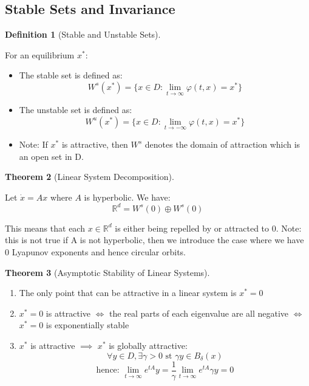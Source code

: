 \documentclass{article}
\newtheorem{thm}{Theorem}[section]
\newtheorem{defn}[thm]{Definition}
\begin{document}
\subsection{Stable Sets and Invariance}
\begin{defn}[Stable and Unstable Sets]\end{defn}
For an equilibrium $x^*$:
\begin{itemize}
    \item The stable set  is defined as: 
    \[W^s(x^*) = \{x \in D : \lim_{t\to\infty}\varphi(t, x) = x^*\}\]
    
    \item The unstable set is defined as: 
    \[W^u(x^*) = \{x \in D : \lim_{t\to-\infty}\varphi(t, x) = x^*\}\]

    \item Note: If $x^*$ is attractive, then $W^s$ denotes the domain of attraction which is an open set in D.
\end{itemize}

\begin{thm}[Linear System Decomposition]\end{thm}
Let $\dot x = Ax$ where $A$ is hyperbolic. We have:
\[ \mathbb{R}^d = W^s(0) \oplus W^s(0)\]

This means that each $x \in \mathbb{R}^d$ is either being repelled by or attracted to 0. Note: this is not true if A is not hyperbolic, then we introduce the case where we have 0 Lyapunov exponents and hence circular orbits.

\begin{thm}[Asymptotic Stability of Linear Systems]
\end{thm}
\begin{enumerate}
    \item The only point that can be attractive in a linear system is $x^* = 0$
    \item $x^*  = 0$ is attractive \newline 
    $\iff$ the real parts of each eigenvalue are all negative \newline
    $\iff$ $x^*  = 0$ is exponentially stable
    \item $x^*$ is attractive $\implies$ $x^*$ is globally attractive:
    \[\forall y \in D, \exists  \gamma> 0 \text{ st } \gamma y \in B_\delta(x)\]
    \[\text{hence: } \lim_{t\to\infty}e^{tA}y = \frac{1}{\gamma} \lim_{t\to\infty}e^{tA}\gamma y = 0\]
\end{enumerate}
\end{document}
